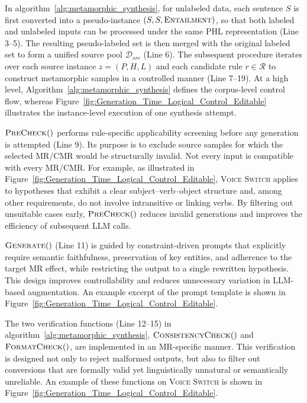 \documentclass[lettersize,journal]{IEEEtran}
\begin{document}
In algorithm~\ref{alg:metamorphic_synthesis}, for unlabeled data, each sentence $S$ is first converted into a pseudo-instance $(S,S,\textsc{Entailment})$, so that both labeled and unlabeled inputs can be processed under the same PHL representation (Line 3--5). The resulting pseudo-labeled set is then merged with the original labeled set to form a unified source pool $\mathcal{D}_{src}$ (Line 6). The subsequent procedure iterates over each source instance $z=(P,H,L)$ and each candidate rule $r\in\mathcal{R}$ to construct metamorphic samples in a controlled manner (Line 7--19). At a high level, Algorithm~\ref{alg:metamorphic_synthesis} defines the corpus-level control flow, whereas Figure~\ref{fig:Generation_Time_Logical_Control_Editable} illustrates the instance-level execution of one synthesis attempt.

$\Call{PreCheck}{ }$ performs rule-specific applicability screening before any generation is attempted (Line 9). Its purpose is to exclude source samples for which the selected MR/CMR would be structurally invalid. Not every input is compatible with every MR/CMR. For example, as illustrated in Figure~\ref{fig:Generation_Time_Logical_Control_Editable}, \textsc{Voice Switch} applies to hypotheses that exhibit a clear subject--verb--object structure and, among other requirements, do not involve intransitive or linking verbs. %
By filtering out unsuitable cases early, $\Call{PreCheck}{ }$ reduces invalid generations and improves the efficiency of subsequent LLM calls.

$\Call{Generate}{ }$ (Line 11) is guided by constraint-driven prompts that explicitly require semantic faithfulness, preservation of key entities, and adherence to the target MR effect, while restricting the output to a single rewritten hypothesis. This design improves controllability and reduces unnecessary variation in LLM-based augmentation. An example excerpt of the prompt template is shown in Figure~\ref{fig:Generation_Time_Logical_Control_Editable}.

The two verification functions (Line 12--15) in algorithm~\ref{alg:metamorphic_synthesis}, $\Call{ConsistencyCheck}{ }$ and $\Call{FormatCheck}{ }$, are implemented in an MR-specific manner. This verification is designed not only to reject malformed outputs, but also to filter out conversions that are formally valid yet linguistically unnatural or semantically unreliable. An example of these functions on \textsc{Voice Switch} is shown in Figure~\ref{fig:Generation_Time_Logical_Control_Editable}.
\end{document}
